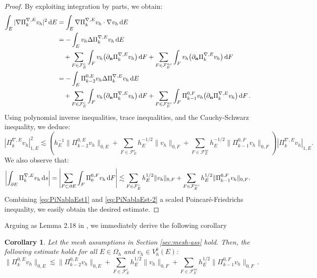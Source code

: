 \documentclass[a4paper,11pt]{article}
\newtheorem{corollary}[theorem]{Corollary}
\theoremstyle{remark}
\theoremstyle{definition}
\newcommand{\PiNablaE}{\Pi^{\nabla,E}_k}
\newcommand{\PiZeroE}{\Pi^{0,E}_k}
\begin{document}
\begin{proof}
By exploiting integration by parts, we obtain:
\[
\begin{aligned}
\int_E |\nabla \PiNablaE v_h|^2 \, {\rm d} E
&= \int_E \nabla \PiNablaE v_h \cdot \nabla v_h \, {\rm d} E \\
&= -\int_E v_h \Delta \PiNablaE v_h \, {\rm d} E \\
& \quad + \sum_{F \in \mathcal{F}^c_E} \int_F v_h \bigl(\partial_\mathbf{n} \PiNablaE v_h \bigr) \, {\rm d}F
+ \sum_{F \in \mathcal{F}^{nc}_E} \int_F v_h \bigl(\partial_\mathbf{n} \PiNablaE v_h \bigr) \, {\rm d}F \\
&= -\int_E \Pi^{0,E}_{k-2} v_h \Delta \PiNablaE v_h \, {\rm d} E \\
& \quad + \sum_{F \in \mathcal{F}^c_E} \int_F v_h \bigl(\partial_\mathbf{n} \PiNablaE v_h \bigr) \, {\rm d}F
+ \sum_{F \in \mathcal{F}^{nc}_E} \int_F \Pi^{0,F}_{k-1} v_h \bigl(\partial_\mathbf{n} \PiNablaE v_h \bigr) \, {\rm d}F \, .
\end{aligned}
\]
Using polynomial inverse inequalities, trace inequalities, and the Cauchy-Schwarz inequality, we deduce:
\begin{equation}\label{eq:PiNablaEst1}
| \PiNablaE v_h |^2_{1,E}
\lesssim
\left(
h_E^{-1} \| \Pi^{0,E}_{k-2} v_h \|_{0,E}
+ \sum_{F \in \mathcal{F}^{c}_E} h_E^{-1/2} \| v_h \|_{0,F}
+ \sum_{F \in \mathcal{F}^{nc}_E} h_E^{-1/2} \| \Pi^{0,F}_{k-1} v_h \|_{0,F}
\right)
| \PiNablaE v_h |_{1,E}.
\end{equation}
We also observe that:
\begin{equation}\label{eq:PiNablaEst-2}
\left| \int_{\partial E} \PiNablaE v_h \, {\rm d}s \right|
= \left| \sum_{F \subset \partial E} \int_{F} \Pi^{0,F}_0 v_h \, {\rm d}F \right|
\lesssim \sum_{F \in \mathcal{F}^{c}_E} h_E^{1/2} \| v_h \|_{0,F}
+ \sum_{F \in \mathcal{F}^{nc}_E} h_E^{1/2} \| \Pi^{0,F}_{k-1} v_h \|_{0,F}.
\end{equation}
Combining \eqref{eq:PiNablaEst1} and \eqref{eq:PiNablaEst-2} a scaled Poincar\'e-Friedrichs inequality, we easily obtain the desired estimate.
\end{proof}
Arguing as Lemma 2.18 in \cite{Brenner2017}, we immediately derive the following corollary
\begin{corollary}\label{cor:easy}
Let the mesh assumptions in Section \ref{sec:mesh-ass} hold. 
Then, the following estimate holds for all $E \in \Omega_h$ and $v_h \in V_h^k(E)$:
\begin{equation}
\| \PiZeroE v_h \|_{0,E}
\lesssim
\| \Pi^{0,E}_{k-2} v_h \|_{0,E}
+ \sum_{F \in \mathcal{F}^{c}_E} h_E^{1/2} \| v_h \|_{0,F}
+ \sum_{F \in \mathcal{F}^{nc}_E} h_E^{1/2} \| \Pi^{0,F}_{k-1} v_h \|_{0,F} \, .
\end{equation}
\end{corollary}
\end{document}
